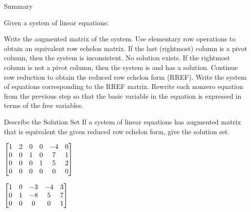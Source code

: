 \documentclass[xcolor=dvipsnames,aspectratio=169,t]{beamer}
\begin{document}
\begin{frame}{Summary}

  \bbox
  Given a system of linear equations:

  \bb
  \ii Write the augmented matrix of the system.
  \ii Use elementary row operations to obtain an equivalent row echelon matrix.
  \bb[(a)]
  \ii If the last (rightmost) column is a pivot column, then the system is \alert{inconsistent}. No solution exists.
  \ii If the rightmost column is not a pivot column, then the system is  and has a solution.
  \ee
  \ii Continue row reduction to obtain the reduced row echelon form (RREF).
  \ii Write the system of equations corresponding to the RREF matrix.
  \ii Rewrite each nonzero equation from the previous step so that the basic variable in the equation is expressed in terms of the free variables.
  \ee
  \ebox

  \end{frame}

\begin{frame}{Describe the Solution Set}
  If a system of linear equations has augmented matrix that is equivalent the given reduced row echelon form, give the solution set.
   
  \bb
  \ii $\displaystyle \begin{bmatrix}
    1 & 2 & 0 & 0 & -4 & 0 \\
    0 & 0 & 1 & 0 & 7 & 1 \\
    0 & 0 & 0 & 1 & 5 & 2 \\
    0 & 0 & 0 & 0 & 0 & 0
  \end{bmatrix}$

  \vfill
  
  \ii  $\displaystyle \begin{bmatrix}
    1 & 0 & -3 & -4 & 3  \\
    0 & 1 & -8 & 5 & 7  \\
    0 & 0 & 0 &  0 & 1 \\
   \end{bmatrix}$
  \ee

\end{frame}
\end{document}
